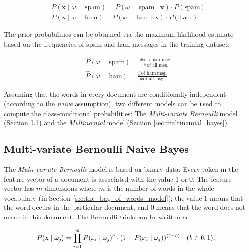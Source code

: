 \documentclass{article}
\begin{document}
\begin{equation}
\begin{split} 
    & P(\textbf{x} \mid \omega = \text{spam}) = P(\omega = \text{spam} \mid \textbf{x}) \cdot P(\text{spam}) \\
    & P(\textbf{x} \mid \omega = \text{ham}) = P(\omega = \text{ham} \mid \textbf{x}) \cdot P(\text{ham})
\end{split}
\end{equation}

The prior probabilities can be obtained via the maximum-likelihood estimate based on the frequencies of spam and ham messages in the training dataset:

\begin{equation}
\begin{split} 
  & \hat{P}(\omega = \text{spam}) = \frac {\text{\# of spam msg.}}{\text{\# of all msg.}} \\
   &  \hat{P}(\omega = \text{ham}) = \frac {\text{\# of ham msg.}}{\text{\# of all msg.}}
\end{split}
\end{equation}

Assuming that the words in every document are conditionally independent (according to the \emph{naive} assumption), two different models can be used to compute the class-conditional probabilities: The \emph{Multi-variate Bernoulli} model (Section \ref{sec:bernoulli_bayes}) and the \emph{Multinomial} model (Section \ref{sec:multinomial_bayes}). 



\subsection{Multi-variate Bernoulli Naive Bayes}
\label{sec:bernoulli_bayes}

The \emph{Multi-variate Bernoulli} model is based on binary data: Every token in the feature vector of a document is associated with the value 1 or 0. The  feature vector has $m$ dimensions where $m$ is the number of words in the whole vocabulary (in Section \ref{sec:the_bag_of_words_model}); the value 1 means that the word occurs in the particular document, and 0 means that the word does
not occur in this document. The Bernoulli trials can be written as

\begin{equation} P(\textbf x \mid \omega_j) = \prod_{i=1}^{m} P(x_i \mid \omega_j)^b \cdot (1-P(x_i \mid  \omega_j))^{(1-b)}  \quad (b \in {0,1}).
\end{equation}
\end{document}
